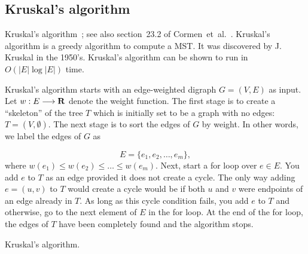 
\subsection{Kruskal's algorithm}
\label{subsec:trees_forests:Kruskal_algorithm}

Kruskal's algorithm~\cite{Kruskal1956}; see also section~23.2 of
Cormen~et~al.~\cite{CormenEtAl2001}. Kruskal's algorithm is a greedy
algorithm to compute a MST. It was discovered by J. Kruskal in the
1950's. Kruskal's algorithm can be shown to run in $O(|E| \log |E|)$
time.

Kruskal's algorithm starts with an edge-weighted digraph $G=(V,E)$
as input. Let $w:E\longrightarrow \mathbf{R}$ denote the weight function.
The first stage is to create a ``skeleton'' of the
tree $T$ which is initially set to be a graph with no
edges: $T=(V,\emptyset)$. The next stage is to
sort the edges of $G$ by weight. In other words, we
label the edges of $G$ as

\[
E = \{e_1,e_2,\dots ,e_m\},
\]
where $w(e_1) \leq w(e_2) \leq \dots \leq w(e_m)$.
Next, start a for loop over $e\in E$. You add
$e$ to $T$ as an edge provided it does not create
a cycle. The only way adding $e=(u,v)$ to $T$ would
create a cycle would be if both $u$ and $v$ were
endpoints of an edge already in $T$. As long as this
cycle condition fails, you add $e$ to $T$ and otherwise,
go to the next element of $E$ in the for loop.
At the end of the for loop, the edges of $T$ have
been completely found and the algorithm stops.

\begin{algorithm}[!htpb]

\caption{Kruskal's algorithm.}
\label{alg:trees_forests:Kruskal_algorithm}
\end{algorithm}

